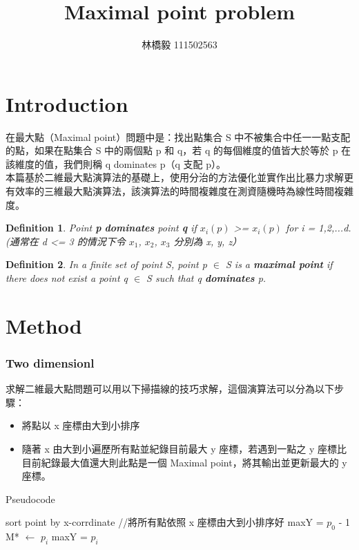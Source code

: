\documentclass[12pt]{article}
\title{Maximal point problem}
\author{林橋毅 111502563}
\newtheorem{definition}{Definition}
\begin{document}
\maketitle

\part{Introduction}
在最大點（Maximal point）問題中是：找出點集合 S 中不被集合中任一一點支配的點，如果在點集合 S 中的兩個點 p 和 q，若 q 的每個維度的值皆大於等於 p 在該維度的值，我們則稱 q dominates p（q 支配 p）。\\

本篇基於二維最大點演算法的基礎上，使用分治的方法優化並實作出比暴力求解更有效率的三維最大點演算法，該演算法的時間複雜度在測資隨機時為線性時間複雜度。

\begin{definition}
	Point \textbf{p} \textbf{dominates} point \textbf{q} if $x_i(p)$ >= $x_i(p)$ for i = 1,2,...d. (通常在 d <= 3 的情況下令 $x_1$, $x_2$, $x_3$ 分別為 x, y, z）
\end{definition}

\begin{definition}
In a finite set of point S, point p $\in$ S is a \textbf{maximal point} if there does not exist a point q $\in$ S such that q \textbf{dominates} p.
\end{definition}


\part{Method}

\section{Two dimensionl}
求解二維最大點問題可以用以下掃描線的技巧求解，這個演算法可以分為以下步驟：
\begin{itemize}
	\item 將點以 x 座標由大到小排序
	\item 隨著 x 由大到小遍歷所有點並紀錄目前最大 y 座標，若遇到一點之 y 座標比目前紀錄最大值還大則此點是一個 Maximal point，將其輸出並更新最大的 y 座標。
\end{itemize}

\begin{algorithm}[H]
	\caption{Pseudocode}
	\begin{algorithmic}
		\State sort point by x-corrdinate //將所有點依照 x 座標由大到小排序好
		\State maxY = $p_0$ - 1
				\State M* $\leftarrow$ $p_i$
				\State maxY = $p_i$
			\EndIf
		\EndFor
	\end{algorithmic}
\end{algorithm}
\end{document}
